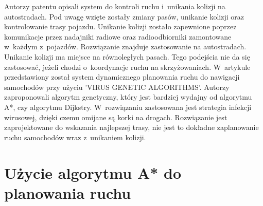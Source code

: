 \newline
\indent
Autorzy patentu \cite{broxmeyer1994vehicle} opisali system do kontroli ruchu i~unikania kolizji na autostradach. Pod uwagę wzięte zostały zmiany pasów, unikanie kolizji oraz kontrolowanie trasy pojazdu. Unikanie kolizji zostało zapewnione poprzez komunikacje przez nadajniki radiowe oraz radioodbiorniki zamontowane w~każdym z~pojazdów. Rozwiązanie znajduje zastosowanie na autostradach. Unikanie kolizji ma miejsce na równoległych pasach. Tego podejścia nie da się zastosować, jeżeli chodzi o~koordynacje ruchu na skrzyżowaniach.
\newline
\indent
W~artykule \cite{kanoh2007dynamic} przedstawiony został system dynamicznego planowania ruchu do nawigacji samochodów przy użyciu 'VIRUS GENETIC ALGORITHMS'. Autorzy zaproponowali algorytm genetyczny, który jest bardziej wydajny od algorytmu A*, czy algorytmu Dijkstry. W~rozwiązaniu zastosowana jest strategia infekcji wirusowej, dzięki czemu omijane są korki na drogach. Rozwiązanie jest zaprojektowane do wskazania najlepszej trasy, nie jest to dokładne zaplanowanie ruchu samochodów wraz z~unikaniem kolizji.

\section{Użycie algorytmu A* do planowania ruchu}

